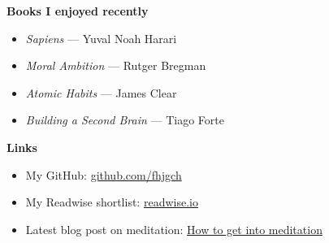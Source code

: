 \documentclass[12pt]{article}
\begin{document}
\textbf{Books I enjoyed recently}

\begin{itemize}
  \item \textit{Sapiens} — Yuval Noah Harari
  \item \textit{Moral Ambition} — Rutger Bregman
  \item \textit{Atomic Habits} — James Clear
  \item \textit{Building a Second Brain} — Tiago Forte
\end{itemize}

\textbf{Links}

\begin{itemize}
  \item My GitHub: \href{https://github.com/fhjgch?tab=repositories}{github.com/fhjgch}
  \item My Readwise shortlist: \href{https://readwise.io/reader/view/9b467e3f-5554-4749-9c2a-be7ffd087aee}{readwise.io}
  \item Latest blog post on meditation: \href{https://fhjgch.github.io/scriptorium/how-to-get-into-meditation.html}{How to get into meditation}
\end{itemize}
\end{document}
